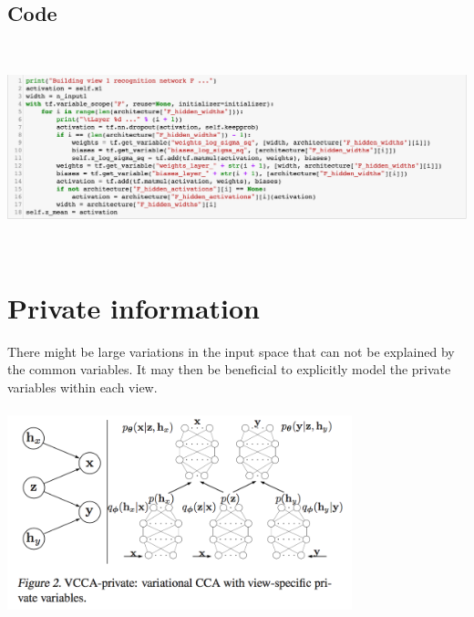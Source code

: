 \documentclass[a4paper]{article}
\begin{document}
\subsection{Code}

\includegraphics[width=17cm, height=6cm]{dnn_code.png}

\section{Private information}
There might be large variations in the input space that can not be explained by the common variables. It may then be beneficial to explicitly model the private variables within each view.
\begin{center}
\includegraphics[width=10cm, height=6cm]{vcca-p.png}
\end{center}
\end{document}
